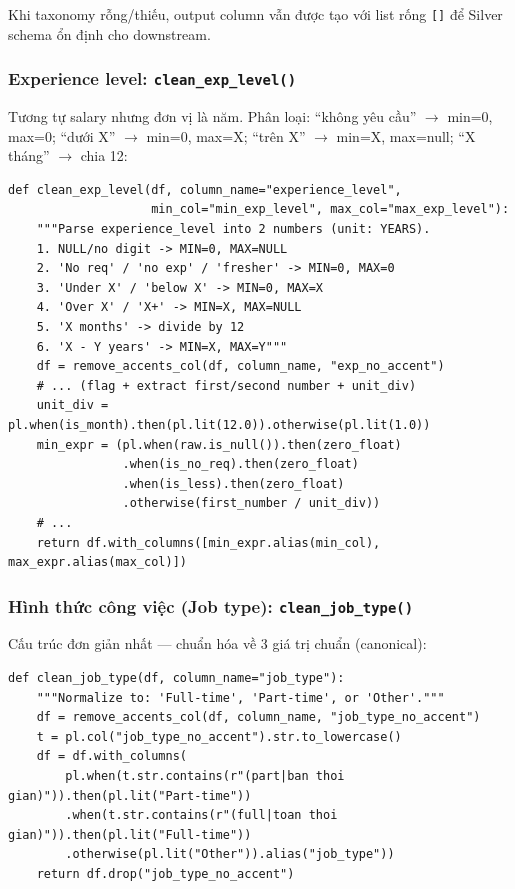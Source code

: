 Khi taxonomy rỗng/thiếu, output column vẫn được tạo với list rống
\texttt{[]} để Silver schema ổn định cho downstream.

\subsubsection{Experience level: \texttt{clean\_exp\_level()}}

Tương tự salary nhưng đơn vị là năm. Phân loại: ``không yêu cầu''
$\to$ min=0, max=0; ``dưới X'' $\to$ min=0, max=X;
``trên X'' $\to$ min=X, max=null; ``X tháng'' $\to$ chia 12:

\begin{lstlisting}[style=pystyle, caption={Experience level: parse sang min/max năm}, label={lst:clean-exp}]
def clean_exp_level(df, column_name="experience_level",
                    min_col="min_exp_level", max_col="max_exp_level"):
    """Parse experience_level into 2 numbers (unit: YEARS).
    1. NULL/no digit -> MIN=0, MAX=NULL
    2. 'No req' / 'no exp' / 'fresher' -> MIN=0, MAX=0
    3. 'Under X' / 'below X' -> MIN=0, MAX=X
    4. 'Over X' / 'X+' -> MIN=X, MAX=NULL
    5. 'X months' -> divide by 12
    6. 'X - Y years' -> MIN=X, MAX=Y"""
    df = remove_accents_col(df, column_name, "exp_no_accent")
    # ... (flag + extract first/second number + unit_div)
    unit_div = pl.when(is_month).then(pl.lit(12.0)).otherwise(pl.lit(1.0))
    min_expr = (pl.when(raw.is_null()).then(zero_float)
                .when(is_no_req).then(zero_float)
                .when(is_less).then(zero_float)
                .otherwise(first_number / unit_div))
    # ...
    return df.with_columns([min_expr.alias(min_col), max_expr.alias(max_col)])
\end{lstlisting}

\subsubsection{Hình thức công việc (Job type): \texttt{clean\_job\_type()}}

Cấu trúc đơn giản nhất — chuẩn hóa về 3 giá trị chuẩn (canonical):

\begin{lstlisting}[style=pystyle, caption={Hình thức công việc: 3 giá trị chuẩn hóa}, label={lst:clean-jobtype}]
def clean_job_type(df, column_name="job_type"):
    """Normalize to: 'Full-time', 'Part-time', or 'Other'."""
    df = remove_accents_col(df, column_name, "job_type_no_accent")
    t = pl.col("job_type_no_accent").str.to_lowercase()
    df = df.with_columns(
        pl.when(t.str.contains(r"(part|ban thoi gian)")).then(pl.lit("Part-time"))
        .when(t.str.contains(r"(full|toan thoi gian)")).then(pl.lit("Full-time"))
        .otherwise(pl.lit("Other")).alias("job_type"))
    return df.drop("job_type_no_accent")
\end{lstlisting}

